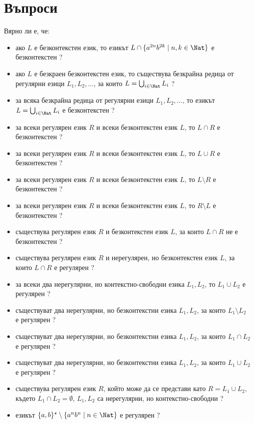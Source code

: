 \section{Въпроси}
Вярно ли е, че:
\begin{itemize}
\item
  ако $L$ е безконтекстен език, то езикът $L \cap \{a^{2n}b^{2k}\mid n,k\in\Nat\}$ е безконтекстен ?
\item
  ако $L$ е безкраен безконтекстен език, то съществува безкрайна редица от регулярни езици $L_1,L_2,\dots$,
  за които $L = \bigcup_{i\in\Nat}L_i$ ?
\item
  за всяка безкрайна редица от регулярни езици $L_1,L_2,\dots$, то 
  езикът $L = \bigcup_{i\in\Nat}L_i$ е безконтекстен ?
\item
  за всеки регулярен език $R$ и всеки безконтекстен език $L$, то $L \cap R$ е безконтекстен ?
\item
  за всеки регулярен език $R$ и всеки безконтекстен език $L$, то $L \cup R$ е безконтекстен ?
\item
  за всеки регулярен език $R$ и всеки безконтекстен език $L$, то $L \setminus R$ е безконтекстен ?
\item
  за всеки регулярен език $R$ и всеки безконтекстен език $L$, то $R \setminus L$ е безконтекстен ?
\item
  съществува регулярен език $R$ и безконтекстен език $L$, за които $L \cap R$ не е безконтекстен ?
\item
  съществува регулярен език $R$ и нерегулярен, но безконтекстен език $L$, за които $L \cap R$ е регулярен ?
\item
  за всеки два нерегулярни, но контекстно-свободни езика $L_1,L_2$, то $L_1\cup L_2$ е регулярен ?
\item
  съществуват два нерегулярни, но безконтекстни езика $L_1,L_2$, за които $L_1\setminus L_2$ е регулярен ?
\item
  съществуват два нерегулярни, но безконтекстни езика $L_1,L_2$, за които $L_1\cap L_2$ е регулярен ?
\item
  съществуват два нерегулярни, но безконтекстни езика $L_1,L_2$, за които $L_1\cup L_2$ е регулярен ?
\item
  съществува регулярен език $R$, който може да се представи като $R = L_1 \cup L_2$, където
  $L_1 \cap L_2 = \emptyset$, $L_1,L_2$ са нерегулярни, но контекстно-свободни ?
\item
  езикът $\{a,b\}^\star \setminus \{a^nb^n \mid n\in\Nat\}$ е регулярен ?

\end{itemize}
